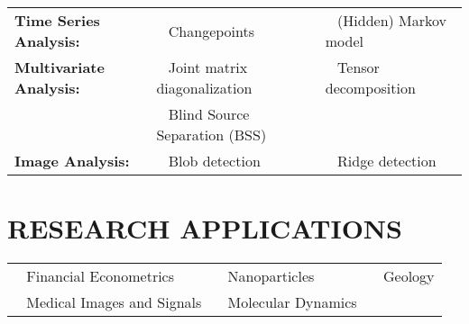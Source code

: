 \documentclass[pdftex,11pt]{article}	%
\begin{document}
\begin{tabularx}{\textwidth}{@{} p{4cm} X X @{}}
	{\bf Time Series Analysis:} & \textbullet ~ Changepoints & \textbullet ~ (Hidden) Markov model \\
	{\bf Multivariate Analysis:} & \textbullet ~ Joint matrix diagonalization & \textbullet ~ Tensor decomposition \\
	& \textbullet ~ Blind Source Separation (BSS) & \\
	{\bf Image Analysis:} & \textbullet ~ Blob detection & \textbullet ~ Ridge detection
\end{tabularx}

\section*{RESEARCH APPLICATIONS}

\begin{tabularx}{\textwidth}{@{} X X X @{}}
	\textbullet ~ Financial Econometrics & \textbullet ~ Nanoparticles & \textbullet ~ Geology \\
	\textbullet  ~ Medical Images and Signals & \textbullet ~ Molecular Dynamics & \\
\end{tabularx}

\else
\end{document}
